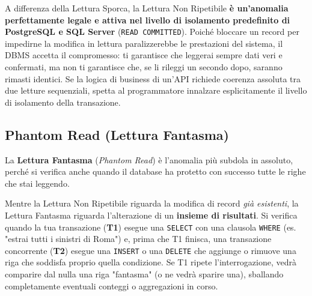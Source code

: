 \begin{observation}
A differenza della Lettura Sporca, la Lettura Non Ripetibile \textbf{è un'anomalia perfettamente legale e attiva nel livello di isolamento predefinito di PostgreSQL e SQL Server} (\texttt{READ COMMITTED}). 
Poiché bloccare un record per impedirne la modifica in lettura paralizzerebbe le prestazioni del sistema, il DBMS accetta il compromesso: ti garantisce che leggerai sempre dati veri e confermati, ma non ti garantisce che, se li rileggi un secondo dopo, saranno rimasti identici.
Se la logica di business di un'API richiede coerenza assoluta tra due letture sequenziali, spetta al programmatore innalzare esplicitamente il livello di isolamento della transazione.
\end{observation}

\subsection{Phantom Read (Lettura Fantasma)}

La \textbf{Lettura Fantasma} (\textit{Phantom Read}) è l'anomalia più subdola in assoluto, perché si verifica anche quando il database ha protetto con successo tutte le righe che stai leggendo. 

Mentre la Lettura Non Ripetibile riguarda la modifica di record \textit{già esistenti}, la Lettura Fantasma riguarda l'alterazione di un \textbf{insieme di risultati}. 
Si verifica quando la tua transazione (\textbf{T1}) esegue una \texttt{SELECT} con una clausola \texttt{WHERE} (es. "estrai tutti i sinistri di Roma") e, prima che T1 finisca, una transazione concorrente (\textbf{T2}) esegue una \texttt{INSERT} o una \texttt{DELETE} che aggiunge o rimuove una riga che soddisfa proprio quella condizione.
Se T1 ripete l'interrogazione, vedrà comparire dal nulla una riga "fantasma" (o ne vedrà sparire una), sballando completamente eventuali conteggi o aggregazioni in corso.

